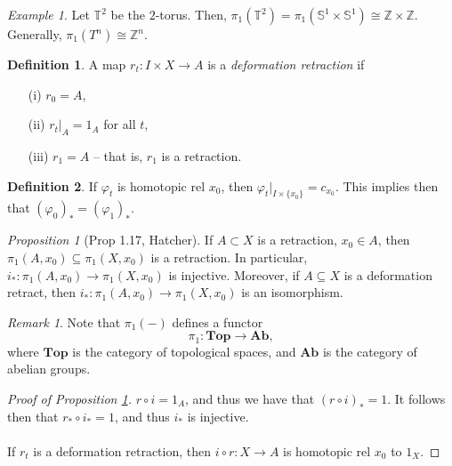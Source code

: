 \documentclass[a4paper]{report}
\theoremstyle{definition}
\newtheorem{definition}{Definition}
\theoremstyle{remark}
\newtheorem{remark}{Remark}
\theoremstyle{proposition}
\newtheorem{proposition}{Proposition}
\theoremstyle{conjecture}
\theoremstyle{lemma}
\theoremstyle{corollary}
\theoremstyle{exercise}
\newtheorem{example}{Example}
\begin{document}
\begin{example}
    Let $\mathbb{T}^2$ be the $2$-torus. Then, 
    $\pi_1(\mathbb{T}^2) = \pi_1(\mathbb{S}^1\times\mathbb{S}^1) \cong \mathbb{Z} \times \mathbb{Z}$.
    Generally, $\pi_1(T^n) \cong \mathbb{Z}^n$.
\end{example}

\begin{definition}
    A map $r_t : I \times X \to A$ is a \emph{deformation retraction} if 
    \begin{itemize}
        \item[(i)] $r_0 = A$,
        \item[(ii)] $r_t\vert_A = 1_A$ for all $t$,
        \item[(iii)] $r_1 = A$ -- that is, $r_1$ is a retraction.
    \end{itemize}
\end{definition}

\begin{definition}
    If $\varphi_t$ is homotopic rel $x_0$, then 
    $\varphi_t\vert_{I \times \lbrace x_0 \rbrace} = c_{x_0}$.
    This implies then that $(\varphi_0)_\ast = (\varphi_1)_\ast$.
\end{definition}

\begin{proposition}[Prop 1.17, Hatcher]\label{prop1.17}
    If $A\subset X$ is a retraction, $x_0 \in A$, then 
    $\pi_1(A,x_0) \subseteq \pi_1(X,x_0)$ is a retraction.
    In particular, $i_\ast : \pi_1(A,x_0) \to \pi_1(X,x_0)$ is injective.
    Moreover, if $A\subseteq X$ is a deformation retract, then 
    $i_\ast : \pi_1(A,x_0) \to \pi_1(X,x_0)$ is an isomorphism.
\end{proposition}

\begin{remark}
    Note that $\pi_1(-)$ defines a functor 
    $$\pi_1 : \mathbf{Top} \longrightarrow \mathbf{Ab},$$
    where $\mathbf{Top}$ is the category of topological spaces,
    and $\mathbf{Ab}$ is the category of abelian groups.
\end{remark}

\begin{proof}[Proof of Proposition \ref{prop1.17}]
    $r\circ i = 1_A$, and thus we have that $(r\circ i)_\ast = 1$.
    It follows then that $r_\ast \circ i_\ast = 1$, and thus 
    $i_\ast$ is injective.\\\\
    If $r_t$ is a deformation retraction, then $i\circ r : X \to A$ 
    is homotopic rel $x_0$ to $1_X$.
\end{proof}
\end{document}
